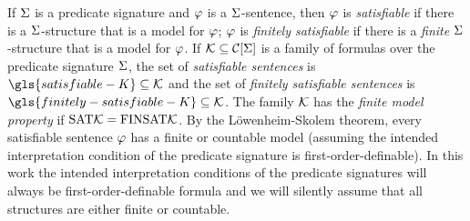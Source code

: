 
If $\mathrm{\Sigma}$ is a predicate signature and $\varphi$ is a $\mathrm{\Sigma}$-sentence, then
$\varphi$ is \emph{satisfiable} if there is a $\mathrm{\Sigma}$-structure that is a model
for $\varphi$; $\varphi$ is \emph{finitely satisfiable} if there is a \emph{finite}
$\mathrm{\Sigma}$-structure that is a model for $\varphi$.
If $\mathcal{K} \subseteq \mathcal{C}[\mathrm{\Sigma}]$ is a family of formulas
over the predicate signature $\mathrm{\Sigma}$, the set of \emph{satisfiable sentences} is
$\gls{satisfiable-K} \subseteq \classFK$ and the set of \emph{finitely
satisfiable sentences} is $\gls{finitely-satisfiable-K} \subseteq \classFK$.
The family $\mathcal{K}$ has the \emph{finite model property} if $\mathrm{SAT}\mathcal{K} =
\mathrm{FINSAT}\mathcal{K}$. By the L\"owenheim-Skolem theorem, every satisfiable sentence 
$\varphi$ has a finite or countable model (assuming the intended interpretation
condition of the predicate signature is first-order-definable).
In this work the intended interpretation conditions of the predicate signatures
will always be first-order-definable formula and we will silently assume that
all structures are either finite or countable.